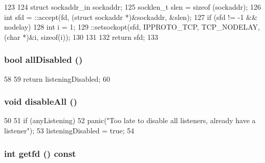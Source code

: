 \begin{DoxyCode}
123 {
124     struct sockaddr_in sockaddr;
125     socklen_t slen = sizeof (sockaddr);
126     int sfd = ::accept(fd, (struct sockaddr *)&sockaddr, &slen);
127     if (sfd != -1 && nodelay) {
128         int i = 1;
129         ::setsockopt(sfd, IPPROTO_TCP, TCP_NODELAY, (char *)&i, sizeof(i));
130     }
131 
132     return sfd;
133 }
\end{DoxyCode}
\hypertarget{classListenSocket_a70ba2cf446c7e6363080efd46cd330c5}{
\subsubsection[{allDisabled}]{\setlength{\rightskip}{0pt plus 5cm}bool allDisabled ()}}
\label{classListenSocket_a70ba2cf446c7e6363080efd46cd330c5}



\begin{DoxyCode}
58 {
59     return listeningDisabled;
60 }
\end{DoxyCode}
\hypertarget{classListenSocket_a238885c747f586049b766fa4fcd5ec12}{
\subsubsection[{disableAll}]{\setlength{\rightskip}{0pt plus 5cm}void disableAll ()}}
\label{classListenSocket_a238885c747f586049b766fa4fcd5ec12}



\begin{DoxyCode}
50 {
51     if (anyListening)
52         panic("Too late to disable all listeners, already have a listener");
53     listeningDisabled = true;
54 }
\end{DoxyCode}
\hypertarget{classListenSocket_a6246250322a585921fc1e9d27b0d7b80}{
\subsubsection[{getfd}]{\setlength{\rightskip}{0pt plus 5cm}int getfd () const}}
\label{classListenSocket_a6246250322a585921fc1e9d27b0d7b80}



